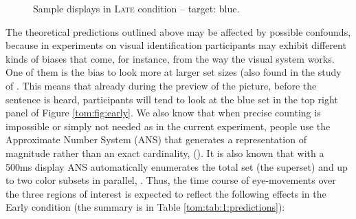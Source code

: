 \documentclass[output=paper]{langscibook}
\begin{document}
\begin{figure}[] 
\caption{Sample displays in \textsc{Late} condition – target: blue.}
    \label{tom:fig:late}
\end{figure}



The theoretical predictions outlined above may be affected by possible confounds, because in experiments on visual
identification participants may exhibit different kinds of biases that come, for instance, from the way the visual
system works. One of them is the bias to look more at larger set sizes (also found in the study of \citet{degen2016availability}. This means that already during the preview of the picture, before the sentence is heard, participants will tend
to look at the blue set in the top right panel of Figure \ref{tom:fig:early}. We also know that when precise counting is impossible or simply not needed as in
the current experiment, people use the Approximate Number System (ANS) that generates a representation of magnitude
rather than an exact cardinality, (\citealt{feigenson2004core, dehaene2009origins, dehaene2011number}). It is also known that with a 500ms display
ANS automatically enumerates the total set (the superset) and up to two color subsets in parallel, \citep{halberda2006multiple}. Thus, the time course of eye-movements over the three regions of interest is expected to reflect the following
effects in the Early condition (the summary is in Table \ref{tom:tab:1:predictions}):
\end{document}
